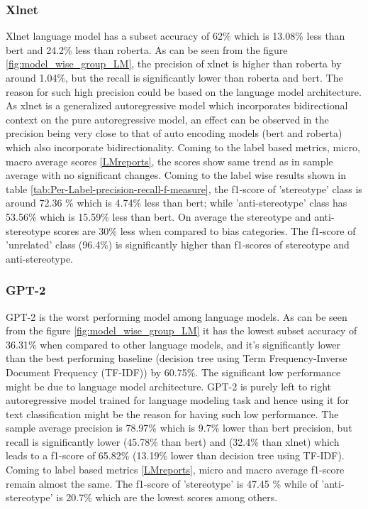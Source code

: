 \subsubsection{Xlnet}
Xlnet language model has a subset accuracy of 62\% which is 13.08\% less than bert and 24.2\% less than roberta. As can be seen from the figure \ref{fig:model_wise_group_LM}, the precision of xlnet is higher than roberta by around 1.04\%, but the recall is significantly lower than roberta and bert. The reason for such high precision could be based on the language model architecture. As xlnet is a generalized autoregressive model which incorporates bidirectional context on the pure autoregressive model, an effect can be observed in the precision being very close to that of auto encoding models (bert and roberta) which also incorporate bidirectionality.  Coming to the label based metrics, micro, macro average scores \ref{LMreports}, the scores show same trend as in sample average with no significant changes. Coming to the label wise results shown in table \ref{tab:Per-Label-precision-recall-f-measure}, the f1-score of 'stereotype' class is around 72.36 \%  which is 4.74\% less than bert; while 'anti-stereotype' class has 53.56\% which is 15.59\% less than bert. On average the stereotype and anti-stereotype scores are 30\% less when compared to bias categories. The f1-score of 'unrelated' class (96.4\%) is significantly higher than f1-scores of stereotype and anti-stereotype.

\subsubsection{GPT-2}
GPT-2 is the worst performing model among language models. As can be seen from the figure \ref{fig:model_wise_group_LM} it has the lowest subset accuracy of 36.31\% when compared to other language models, and it's significantly lower than the best performing baseline (decision tree using Term Frequency-Inverse Document Frequency (TF-IDF)) by 60.75\%. The significant low performance might be due to language model architecture. GPT-2 is purely left to right autoregressive model trained for language modeling task and hence using it for text classification might be the reason for having such low performance. The sample average precision is 78.97\% which is 9.7\% lower than bert precision, but recall is significantly lower (45.78\% than bert) and  (32.4\% than xlnet) which leads to a f1-score of 65.82\% (13.19\% lower than decision tree using TF-IDF). Coming to label based metrics \ref{LMreports}, micro and macro average f1-score remain almost the same. The f1-score of 'stereotype' is 47.45 \% while of 'anti-stereotype' is 20.7\% which are the lowest scores among others. 


